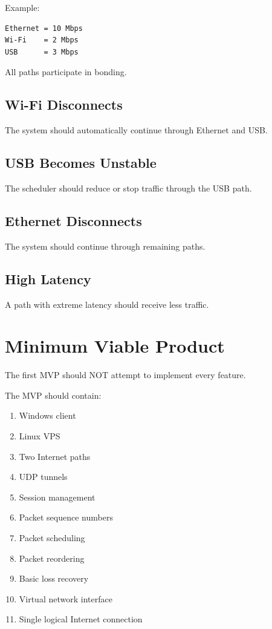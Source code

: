 \documentclass[12pt,a4paper]{article}
\begin{document}
Example:

\begin{verbatim}
Ethernet = 10 Mbps
Wi-Fi    = 2 Mbps
USB      = 3 Mbps
\end{verbatim}

All paths participate in bonding.

\subsection{Wi-Fi Disconnects}

The system should automatically continue through Ethernet and USB.

\subsection{USB Becomes Unstable}

The scheduler should reduce or stop traffic through the USB path.

\subsection{Ethernet Disconnects}

The system should continue through remaining paths.

\subsection{High Latency}

A path with extreme latency should receive less traffic.


\section{Minimum Viable Product}

The first MVP should NOT attempt to implement every feature.

The MVP should contain:

\begin{enumerate}
    \item Windows client
    \item Linux VPS
    \item Two Internet paths
    \item UDP tunnels
    \item Session management
    \item Packet sequence numbers
    \item Packet scheduling
    \item Packet reordering
    \item Basic loss recovery
    \item Virtual network interface
    \item Single logical Internet connection
\end{enumerate}
\end{document}
